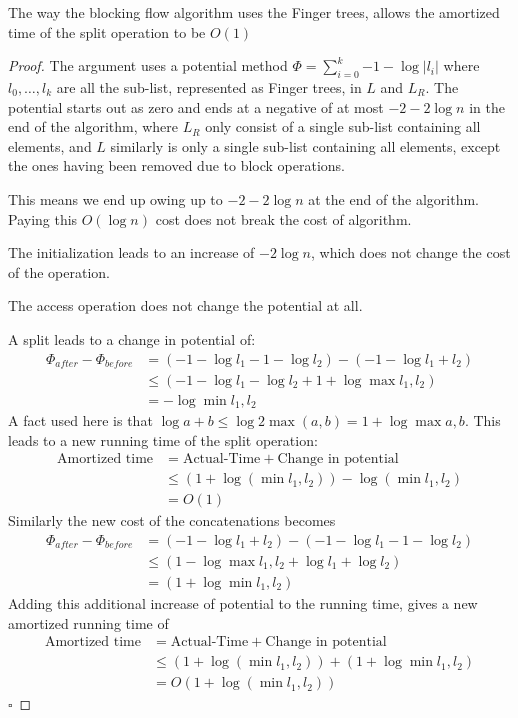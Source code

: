 \begin{lemma}
	The way the blocking flow algorithm uses the Finger trees, allows the amortized time of the split operation to be $O(1)$
\end{lemma}
\begin{proof}
The argument uses a potential method $\Phi = \sum_{i=0}^{k}{-1-\log{|l_i|}}$ where $l_0,\dots,l_k$ are all the sub-list, represented as Finger trees, in
$L$ and $L_R$. 
The potential starts out as zero and ends at a negative of at most $-2 - 2\log{n}$ in the end of the algorithm, where $L_R$ only consist
of a single sub-list containing all elements, and $L$ similarly is only a single sub-list containing all elements, except the ones having been removed due to block operations.

This means we end up owing up to $-2 - 2\log{n}$ at the end of the algorithm. Paying this $O(\log{n})$ cost does not break the cost of algorithm. 

The initialization leads to an increase of $-2\log{n}$, which does not change the cost of the operation.

The access operation does not change the potential at all.

A split leads to a change in potential of:
\begin{align*}
	\Phi_{after} - \Phi_{before} & = (-1 - \log{l_1} - 1 - \log{l_2}) - (-1 - \log{l_1+l_2})\\
	& \leq (-1 - \log{l_1} - \log{l_2} + 1 + \log{\max{l_1,l_2}})\\
	& = - \log{\min{l_1,l_2}}
\end{align*}
A fact used here is that $\log{a+b} \leq \log{2\max{(a,b)}} = 1 + \log{\max{a,b}}$.
This leads to a new running time of the split operation: 
\begin{align*}
	\text{Amortized time} & = \text{Actual-Time} + \text{Change in potential}\\
	& \leq (1+\log{(\min{l_1,l_2})}) - \log{(\min{l_1,l_2})}\\
	& = O(1)
\end{align*}
Similarly the new cost of the concatenations becomes  
\begin{align*}
	\Phi_{after} - \Phi_{before} & = (-1 - \log{l_1+l_2}) - (-1 - \log{l_1} - 1 - \log{l_2})\\
	& \leq (1 - \log{\max{l_1,l_2}} + \log{l_1} + \log{l_2})\\
	& = (1 + \log{\min{l_1,l_2}})
\end{align*}
Adding this additional increase of potential to the running time, gives a new amortized running time of
\begin{align*}
	\text{Amortized time} & = \text{Actual-Time} + \text{Change in potential}\\
	& \leq (1+\log{(\min{l_1,l_2})}) + (1 + \log{\min{l_1,l_2}})\\
	& = O(1+\log{(\min{l_1,l_2})})
\end{align*} $\square$
\end{proof}

